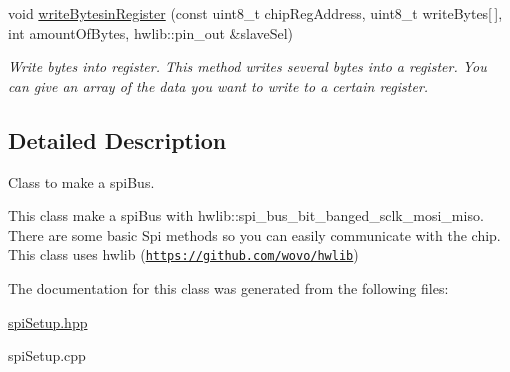 \begin{DoxyCompactItemize}
\mbox{\label{classspiSetup_a5a6778d3c9ec9c6707ed1fc351978cd3}} 
void \hyperlink{classspiSetup_a5a6778d3c9ec9c6707ed1fc351978cd3}{write\+Bytesin\+Register} (const uint8\+\_\+t chip\+Reg\+Address, uint8\+\_\+t write\+Bytes\mbox{[}$\,$\mbox{]}, int amount\+Of\+Bytes, hwlib\+::pin\+\_\+out \&slave\+Sel)
\begin{DoxyCompactList}\small\item\em Write bytes into register.  This method writes several bytes into a register. You can give an array of the data you want to write to a certain register. \end{DoxyCompactList}\end{DoxyCompactItemize}


\subsection{Detailed Description}
Class to make a spi\+Bus. 

This class make a spi\+Bus with hwlib\+::spi\+\_\+bus\+\_\+bit\+\_\+banged\+\_\+sclk\+\_\+mosi\+\_\+miso. There are some basic Spi methods so you can easily communicate with the chip. This class uses hwlib (\href{https://github.com/wovo/hwlib}{\tt https\+://github.\+com/wovo/hwlib}) 

The documentation for this class was generated from the following files\+:\begin{DoxyCompactItemize}
\item 
\hyperlink{spiSetup_8hpp}{spi\+Setup.\+hpp}\item 
spi\+Setup.\+cpp\end{DoxyCompactItemize}
